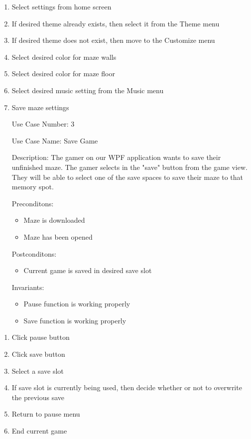 \documentclass[10pt,conference,onecolumn,compsoc]{IEEEtran}
\begin{document}
\begin{enumerate}
\item Select settings from home screen
\item If desired theme already exists, then select it from the Theme menu
\item If desired theme does not exist, then move to the Customize menu
\item Select desired color for maze walls
\item Select desired color for maze floor
\item Select desired music setting from the Music menu
\item Save maze settings


\end{enumerate}
\begin{itemize}
\item[Use Case Number:] 3
\item[Use Case Name:] Save Game
\item[Description:] The gamer on our WPF application wants to save their unfinished maze. The gamer selects in the "save" button from the game view. They will be able to select one of the save spaces to save their maze to that memory spot.
\item[Preconditons:]
\begin{itemize} 
\item Maze is downloaded
\item Maze has been opened
\end{itemize}

\item[Postconditons:]
\begin{itemize} 
\item Current game is saved in desired save slot
\end{itemize}
\item[Invariants:]
\begin{itemize} 
\item Pause function is working properly
\item Save function is working properly
\end{itemize}
\end{itemize}


\begin{enumerate}
\item Click pause button
\item Click save button
\item Select a save slot
\item If save slot is currently being used, then decide whether or not to overwrite the previous save
\item Return to pause menu
\item End current game

\end{enumerate}
\end{document}
